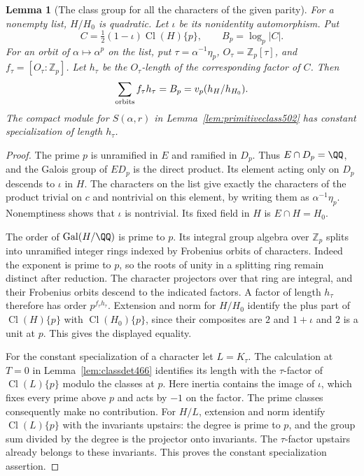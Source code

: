 \documentclass[a4paper,11pt]{article}
\newtheorem{lemma}[proposition]{Lemma}
\theoremstyle{definition}
\theoremstyle{remark}
\newcommand{\ZZ}{\mathbb Z}\newcommand{\ord}{\operatorname{ord}}
\numberwithin{equation}{section}
\newcommand{\Cl}{\operatorname{Cl}}
\begin{document}
\begin{lemma}[The class group for all the characters of the given parity]
\leavevmode\label{lem:onehalfclass644}
For a nonempty list, \(H/H_0\) is quadratic. Let \(\iota\)
be its nonidentity automorphism. Put
\[
 C=\tfrac12(1-\iota)\Cl(H)\{p\},\qquad B_p=\log_p|C|.
\]
For an orbit of \(\alpha\mapsto\alpha^p\) on the list, put
\(\tau=\alpha^{-1}\eta_p\), \(O_\tau=\ZZ_p[\tau]\),
and \(f_\tau=[O_\tau:\ZZ_p]\). Let \(h_\tau\) be the
\(O_\tau\)-length of the corresponding factor of \(C\).
Then
\[
   \sum_{\rm orbits} f_\tau h_\tau=B_p
              =v_p(h_H/h_{H_0}).
\]
The compact module for \(S(\alpha,r)\) in
Lemma~\ref{lem:primitiveclass502} has constant specialization
of length \(h_\tau\).
\end{lemma}
\begin{proof}
The prime \(p\) is unramified in \(E\) and ramified in \(D_p\).
Thus \(E\cap D_p=\QQ\), and the Galois group of \(E D_p\) is
the direct product. Its element acting only on \(D_p\) descends
to \(\iota\) in \(H\). The characters on the list give exactly
the characters of the product trivial on \(c\) and nontrivial
on this element, by writing them as \(\alpha^{-1}\eta_p\).
Nonemptiness shows that \(\iota\) is nontrivial. Its fixed field
in \(H\) is \(E\cap H=H_0\).

The order of \(\operatorname{Gal}(H/\QQ)\) is prime to \(p\).
Its integral group algebra over \(\ZZ_p\) splits into unramified
integer rings indexed by Frobenius orbits of characters.
Indeed the exponent is prime to \(p\), so the roots of unity
in a splitting ring remain distinct after reduction. The
character projectors over that ring are integral, and their
Frobenius orbits descend to the indicated factors. A factor
of length \(h_\tau\) therefore has order \(p^{f_\tau h_\tau}\).
Extension and norm for \(H/H_0\) identify the plus part of
\(\Cl(H)\{p\}\) with \(\Cl(H_0)\{p\}\), since their composites
are \(2\) and \(1+\iota\) and \(2\) is a unit at \(p\).
This gives the displayed equality.

For the constant specialization of a character let \(L=K_\tau\).
The calculation at \(T=0\) in Lemma~\ref{lem:classdet466}
identifies its length with the \(\tau\)-factor of
\(\Cl(L)\{p\}\) modulo the classes at \(p\). Here inertia
contains the image of \(\iota\), which fixes every prime above
\(p\) and acts by \(-1\) on the factor. The prime classes
consequently make no contribution. For \(H/L\), extension
and norm identify \(\Cl(L)\{p\}\) with the invariants upstairs:
the degree is prime to \(p\), and the group sum divided by the
degree is the projector onto invariants. The \(\tau\)-factor
upstairs already belongs to these invariants. This proves the
constant specialization assertion.
\end{proof}
\end{document}

